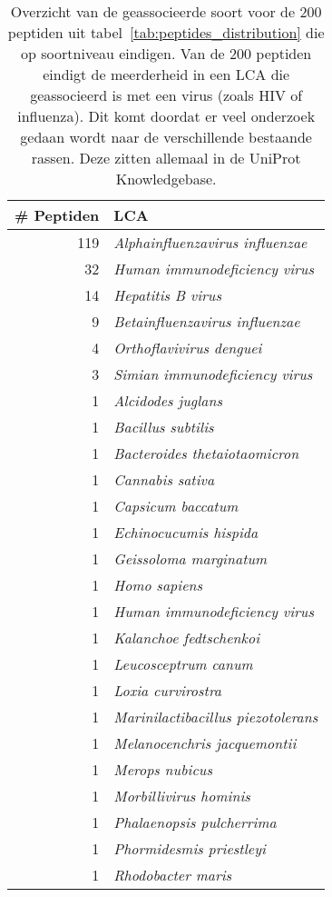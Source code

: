 \begin{table}[h!]
    \centering
    \begin{tabular}{|r|l|}
        \hline
        \textbf{\# Peptiden} & \textbf{LCA} \\ \hline
        119 & \textit{Alphainfluenzavirus influenzae} \\ \hline
        32 & \textit{Human immunodeficiency virus} \\ \hline
        14 & \textit{Hepatitis B virus} \\ \hline
        9 & \textit{Betainfluenzavirus influenzae} \\ \hline
        4 & \textit{Orthoflavivirus denguei} \\ \hline
        3 & \textit{Simian immunodeficiency virus}   \\ \hline
        1 & \textit{Alcidodes juglans} \\ \hline
        1 & \textit{Bacillus subtilis} \\ \hline
        1 & \textit{Bacteroides thetaiotaomicron} \\ \hline
        1 & \textit{Cannabis sativa} \\ \hline
        1 & \textit{Capsicum baccatum} \\ \hline
        1 & \textit{Echinocucumis hispida} \\ \hline
        1 & \textit{Geissoloma marginatum} \\ \hline
        1 & \textit{Homo sapiens} \\ \hline
        1 & \textit{Human immunodeficiency virus} \\ \hline
        1 & \textit{Kalanchoe fedtschenkoi} \\ \hline
        1 & \textit{Leucosceptrum canum} \\ \hline
        1 & \textit{Loxia curvirostra} \\ \hline
        1 & \textit{Marinilactibacillus piezotolerans} \\ \hline
        1 & \textit{Melanocenchris jacquemontii} \\ \hline
        1 & \textit{Merops nubicus} \\ \hline
        1 & \textit{Morbillivirus hominis} \\ \hline
        1 & \textit{Phalaenopsis pulcherrima} \\ \hline
        1 & \textit{Phormidesmis priestleyi} \\ \hline
        1 & \textit{Rhodobacter maris} \\ \hline
    \end{tabular}
    \caption{Overzicht van de geassocieerde soort voor de 200 peptiden uit tabel~\ref{tab:peptides_distribution} die op soortniveau eindigen.
    Van de 200 peptiden eindigt de meerderheid in een LCA die geassocieerd is met een virus (zoals HIV of influenza). Dit komt doordat er veel onderzoek gedaan wordt naar de verschillende bestaande rassen. Deze zitten allemaal in de UniProt Knowledgebase.}
    \label{tab:peptides_species}
\end{table}
